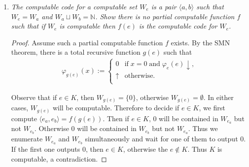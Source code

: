 \documentclass{article}
\begin{document}
\begin{enumerate}[label={\bf Q\arabic*:}]
    \begin{proof}
      Assume such a partial computable function $f$ exists. By the SMN
      theorem, there is a total recursive function $g(e)$ such that
      \begin{align*}
        \varphi_{g(e)}(s) :=
        \begin{cases}
          0, &\text{if}\; \varphi_{e}(e)\; \text{has not halted after}\;
            s\; \text{steps}\\
          1, &\text{otherwise}.
        \end{cases}
      \end{align*}

      Then if $e\in K$ halts, $\varphi_{g(e)}$ will be the characteristic
      function of the finite set $\{1\}$, otherwise $\varphi_{g(e)}$ will
      be the characteristic function of the empty set. Thus $e\in K$ if and
      only if $f(g(e))$ is the index corresponding to the finite set
      $\{1\}$, which contradicts the incomputability of $K$.
    \end{proof}

  \item \it The computable code for a computable set $W_e$ is a pair
    $\langle a,b\rangle$ such that $W_e=W_a$ and $W_a\sqcup
    W_b=\mathbb{N}$. Show there is no partial computable function $f$ such
    that if $W_e$ is computable then $f(e)$ is the computable code for
    $W_e$.

    \begin{proof}
      Assume such a partial computable function $f$ exists. By the SMN
      theorem, there is a total recursive function $g(e)$ such that
      \begin{align*}
        \varphi_{g(e)}(x) :=
        \begin{cases}
          0 &\text{if}\; x=0\; \text{and}\; \varphi_e(e)\downarrow,\\
          \uparrow &\text{otherwise}.\\
        \end{cases}
      \end{align*}

      Observe that if $e\in K$, then $W_{g(e)}=\{0\}$, otherwise
      $W_{g(e)}=\emptyset$. In either cases, $W_{g(e)}$ will be computable.
      Therefore to decide if $e\in K$, we first compute $\langle
      e_a,e_b\rangle=f(g(e))$. Then if $e\in K$, 0 will be contained in
      $W_{e_a}$ but not $W_{e_b}$. Otherwise 0 will be contained in
      $W_{e_b}$ but not $W_{e_a}$. Thus we enumerate $W_{e_a}$ and
      $W_{e_b}$ simultaneously and wait for one of them to output 0. If the
      first one outputs 0, then $e\in K$, otherwise the $e\not\in K$. Thus
      $K$ is computable, a contradiction.
    \end{proof}


\end{enumerate}
\end{document}
